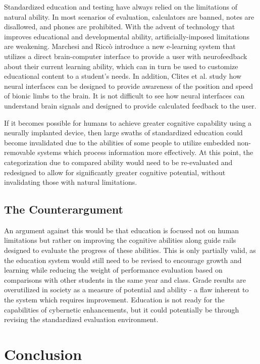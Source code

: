 \documentclass[10pt, oneside, letterpaper]{article}
\begin{document}
\begin{multicols}{2}
	Standardized education and testing have always relied on the limitations of natural ability. In most scenarios of evaluation, calculators are banned, notes are disallowed, and phones are prohibited. With the advent of technology that improves educational and developmental ability, artificially-imposed limitations are weakening. Marchesi and Riccò \cite{Marchesi2013} introduce a new e-learning system that utilizes a direct brain-computer interface to provide a user with neurofeedback about their current learning ability, which can in turn be used to customize educational content to a student's needs. In addition, Clites et al. \cite{Clites2018} study how neural interfaces can be designed to provide awareness of the position and speed of bionic limbs to the brain. It is not difficult to see how neural interfaces can understand brain signals and designed to provide calculated feedback to the user.

	If it becomes possible for humans to achieve greater cognitive capability using a neurally implanted device, then large swaths of standardized education could become invalidated due to the abilities of some people to utilize embedded non-removable systems which process information more effectively. At this point, the categorization due to compared ability would need to be re-evaluated and redesigned to allow for significantly greater cognitive potential, without invalidating those with natural limitations.

	\subsection{The Counterargument}

	An argument against this would be that education is focused not on human limitations but rather on improving the cognitive abilities along guide rails designed to evaluate the progress of these abilities. This is only partially valid, as the education system would still need to be revised to encourage growth and learning while reducing the weight of performance evaluation based on comparisons with other students in the same year and class. Grade results are overutilized in society as a measure of potential and ability - a flaw inherent to the system which requires improvement. Education is not ready for the capabilities of cybernetic enhancements, but it could potentially be through revising the standardized evaluation environment.

	\section{Conclusion}


\end{multicols}
\end{document}
